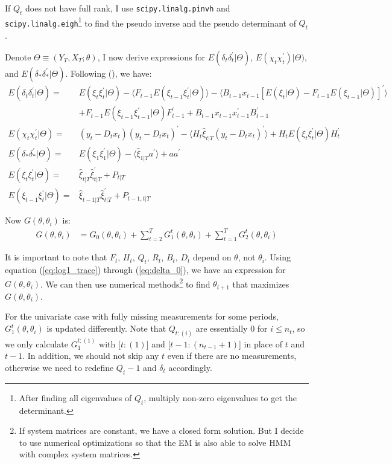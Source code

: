 \documentclass[10pt]{article}
\numberwithin{equation}{section}
\begin{document}
If $Q_t$ does not have full rank, I use \texttt{scipy.linalg.pinvh} and \texttt{scipy.linalg.eigh}\footnote{After finding all eigenvalues of $Q_t$, multiply non-zero eigenvalues to get the determinant.} to find the pseudo inverse and the pseudo determinant of $Q_t$.

Denote $\Theta\equiv (Y_T,X_T;\theta)$, I now derive expressions for $E(\delta_t\delta_t^{'}|\Theta)$, $E(\chi_t\chi_t^{'})|\Theta)$, and $E(\delta_*\delta_*^{'}|\Theta)$. Following (\cite{koopman1992exact}), we have:
\begin{align}
    E(\delta_t\delta_t^{'}|\Theta) =& E(\xi_t\xi_t^{'}|\Theta) - \langle F_{t-1}E(\xi_{t-1}\xi_t^{'}|\Theta)\rangle 
        - \langle B_{t-1}x_{t-1}[E(\xi_t|\Theta) - F_{t-1}E(\xi_{t-1}|\Theta)]^{'}\rangle \nonumber \\
        &+F_{t-1}E(\xi_{t-1}\xi_{t-1}^{'}|\Theta)F_{t-1}^{'} + B_{t-1}x_{t-1}x_{t-1}^{'}B_{t-1}^{'} \label{eq:delta_t} \\
    E(\chi_t\chi_t^{'}|\Theta) =& (y_t-D_tx_t)(y_t-D_tx_t)^{'}-\langle H_t\hat{\xi}_{t|T}(y_t-D_tx_t)^{'}\rangle + H_tE(\xi_t\xi_t^{'}|\Theta)H_t^{'} \label{eq:chi_t} \\ 
    E(\delta_*\delta_*^{'}|\Theta) =& E(\xi_1\xi_1^{'}|\Theta) - \langle\hat{\xi}_{1|T}a^{'}\rangle + aa^{'} \label{eq:delta_0} \\
    E(\xi_t\xi_t^{'}|\Theta) =& \hat{\xi}_{t|T}\hat{\xi}_{t|T}^{'} + P_{t|T} \nonumber \\
    E(\xi_{t-1}\xi_t^{'}|\Theta) =& \hat{\xi}_{t-1|T}\hat{\xi}_{t|T}^{'} + P_{t-1,t|T} \nonumber
\end{align}

Now $G(\theta,\theta_{i})$ is:
\begin{align*}
    G(\theta,\theta_{i}) &= G_0(\theta,\theta_i) + \sum_{t=2}^{T}G_1^t(\theta,\theta_{i}) + \sum_{t=1}^{T}G_2^t(\theta,\theta_{i})
\end{align*}

It is important to note that $F_t$, $H_t$, $Q_t$, $R_t$, $B_t$, $D_t$ depend on $\theta$, not $\theta_i$. Using equation (\ref{eq:log1_trace}) through (\ref{eq:delta_0}), we have an expression for $G(\theta,\theta_i)$. We can then use numerical methods\footnote{If system matrices are constant, we have a closed form solution. But I decide to use numerical optimizations so that the EM is also able to solve HMM with complex system matrices.} to find $\theta_{i+1}$ that maximizes $G(\theta,\theta_{i})$.

For the univariate case with fully missing measurements for some periods, $G_1^t(\theta,\theta_i)$ is updated differently. Note that $Q_{t:(i)}$ are essentially $0$ for $i\leq n_t$, so we only calculate $G_1^{t:(1)}$ with [$t:(1)$] and [$t-1:(n_{t-1}+1)$] in place of $t$ and $t-1$. In addition, we should not skip any $t$ even if there are no measurements, otherwise we need to redefine $Q_t-1$ and $\delta_t$ accordingly. 
\end{document}
